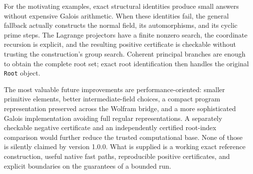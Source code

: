 \documentclass[11pt,a4paper]{article}
\theoremstyle{definition}
\theoremstyle{remark}
\newcommand{\code}[1]{\texttt{#1}}
\begin{document}
For the motivating examples, exact structural identities produce small answers
without expensive Galois arithmetic. When these identities fail, the general
fallback actually constructs the normal field, its automorphisms, and its
cyclic prime steps. The Lagrange projectors have a finite nonzero search, the
coordinate recursion is explicit, and the resulting positive certificate is
checkable without trusting the construction's group search. Coherent principal
branches are enough to obtain the complete root set; exact root identification
then handles the original \code{Root} object.

The most valuable future improvements are performance-oriented: smaller
primitive elements, better intermediate-field choices, a compact program
representation preserved across the Wolfram bridge, and a more sophisticated
Galois implementation avoiding full regular representations. A separately
checkable negative certificate and an independently certified root-index
comparison would further reduce the trusted computational base. None of those
is silently claimed by version 1.0.0. What is supplied is a working exact
reference construction, useful native fast paths, reproducible positive
certificates, and explicit boundaries on the guarantees of a bounded run.

\appendix
\end{document}
